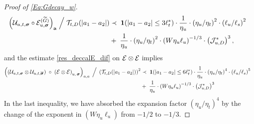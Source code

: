 \documentclass[10pt,reqno]{article}
\theoremstyle{plain} %
\theoremstyle{remark}
\numberwithin{equation}{section}
\begin{document}
\begin{proof}[Proof of \eqref{Eq:Gdecay_w}]
\begin{align}  \label{res_deccalE_2}
     \Big(\mathcal{U}_{u,t, \boldsymbol{\sigma}} \circ  \mathcal{E}^{( \widetilde{G} )}_{u, \boldsymbol{\sigma}}\Big)_{\mathbf{a}} 
    \;\Big/\; 
{\cal T}_{t, D}(|a_1-a_2|)
 &\prec \;  {\bf1}(|a_1-a_2|\le 3\ell_t^*)\cdot  \frac{1} {\eta_u} \cdot \left(\eta_u / \eta_t\right)^2\cdot \left(\ell_u / \ell_s\right)^2 
 \nonumber \\
  &+\;    \frac{1}{\eta_u} 
  \cdot\left(\eta_u / \eta_t\right)^2 \cdot
       \left(W \eta_u \ell_u\right)^{-1/3}  \cdot \left({\cal J}^{*}_{u,D} \right)^{3 }, 
       \end{align} 
and  the  estimate  \eqref{res_deccalE_dif} on $\cal E\otimes\cal E$  implies  
\begin{align} \label{res_deccalE_3}
  \left(\left(
   \mathcal{U}_{u, t,  \boldsymbol{\sigma}}
   \otimes 
   \mathcal{U}_{u, t,  \overline{\boldsymbol{\sigma}}}
   \right) \;\circ  \;
   \left( \mathcal{E} \otimes  \mathcal{E} \right)
   _{u, \,\boldsymbol{\sigma}  }
   \right)_{{\textbf a}, {\textbf a}}
     \;\Big/\; 
 \left({\cal T}_{t, D}(|a_1-a_2|)\right)^2
 &\prec \;  {\bf1}(|a_1-a_2|\le 6\ell_t^*)\cdot  \frac{1} {\eta_u} \cdot \left(\eta_u / \eta_t\right)^4\cdot \left(\ell_u / \ell_s\right)^5 
 \nonumber \\
 &+ \;  \frac{1}{\eta_u} 
  \cdot
       \left(W \eta_u \ell_u\right)^{-1/3}  \cdot \left({\cal J}^{*}_{u,D} \right)^{3 }  
\end{align}
In the last inequality, we have absorbed the  expansion factor $\left(\eta_u / \eta_t\right)^4$ by the change of the exponent in $   \left(W \eta_u \ell_u\right)$ from $-1/2$ to $-1/3$.  



\end{proof}
\end{document}
